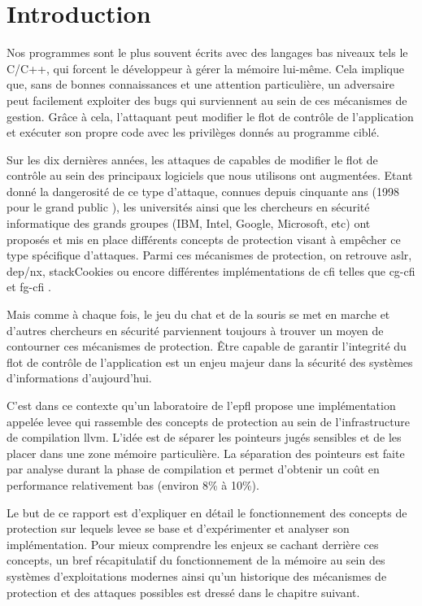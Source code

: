 \chapter{Introduction}
\label{chap:introduction}

Nos programmes sont le plus souvent écrits avec des langages bas niveaux tels le C/C++, qui forcent le développeur à gérer la mémoire lui-même. Cela implique que, sans de bonnes connaissances et une attention particulière, un adversaire peut facilement exploiter des bugs qui surviennent au sein de ces mécanismes de gestion. Grâce à cela, l’attaquant peut modifier le flot de contrôle de l'application et exécuter son propre code avec les privilèges donnés au programme ciblé.

Sur les dix dernières années, les attaques de capables de modifier le flot de contrôle au sein des principaux logiciels que nous utilisons ont augmentées. Etant donné la dangerosité de ce type d’attaque, connues depuis cinquante ans (1998 pour le \og grand public \fg \cite{pharck49, SmashingTheStack}), les universités ainsi que les chercheurs en sécurité informatique des grands groupes (IBM, Intel, Google, Microsoft, etc) ont proposés et mis en place différents concepts de protection visant à empêcher ce type spécifique d'attaques. Parmi ces mécanismes de protection, on retrouve \gls{aslr}, \gls{dep}/\gls{nx}, \og \gls{stackCookies} \fg ou encore différentes implémentations de \og \gls{cfi} \fg telles que \og \gls{cg-cfi} \fg et \og \gls{fg-cfi} \fg.

Mais comme à chaque fois, le jeu du chat et de la souris se met en marche et d'autres chercheurs en sécurité parviennent toujours à trouver un moyen de contourner ces mécanismes de protection. Être capable de garantir l'integrité du flot de contrôle de l'application est un enjeu majeur dans la sécurité des systèmes d'informations d'aujourd'hui.

C'est dans ce contexte qu'un laboratoire de l’\gls{epfl} propose une implémentation appelée \gls{levee} qui rassemble des concepts de protection au sein de l’infrastructure de compilation \gls{llvm}. L’idée est de séparer les pointeurs jugés sensibles et de les placer dans une zone mémoire particulière. La séparation des pointeurs est faite par analyse durant la phase de compilation et permet d’obtenir un coût en performance relativement bas (environ 8\% à 10\%).

Le but de ce rapport est d’expliquer en détail le fonctionnement des concepts de protection sur lequels \gls{levee} se base et d’expérimenter et analyser son implémentation. Pour mieux comprendre les enjeux se cachant derrière ces concepts, un bref récapitulatif du fonctionnement de la mémoire au sein des systèmes d'exploitations modernes ainsi qu'un historique des mécanismes de protection et des attaques possibles est dressé dans le chapitre suivant.
